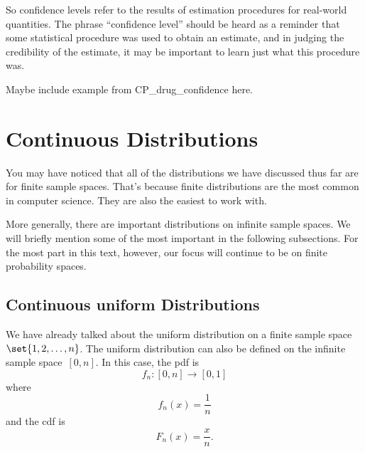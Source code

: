 So confidence levels refer to the results of estimation procedures for
real-world quantities.  The phrase ``confidence level'' should be heard as
a reminder that some statistical procedure was used to obtain an estimate,
and in judging the credibility of the estimate, it may be important to
learn just what this procedure was.

\begin{editingnotes}
Maybe include example from CP\_drug\_confidence here.
\end{editingnotes}

\begin{problems}
\practiceproblems
{}

\classproblems
{}

\examproblems
{}
\end{problems}


\section{Continuous Distributions}

You may have noticed that all of the distributions we have discussed
thus far are for finite sample spaces.  That's because finite
distributions are the most common in computer science.  They are also
the easiest to work with.

More generally, there are important distributions on infinite sample
spaces.  We will briefly mention some of the most important in the
following subsections.  For the most part in this text, however, our
focus will continue to be on finite probability spaces.

\subsection{Continuous uniform Distributions}

We have already talked about the uniform distribution on a finite
sample space~$\set{1, 2, \dots, n}$.  The uniform distribution can
also be defined on the infinite sample space~$[0, n]$.  In this case,
the pdf is
\begin{equation*}
    f_n: [0, n] \to [0, 1]
\end{equation*}
where
\begin{equation*}
    f_n(x) = \frac{1}{n}
\end{equation*}
and the cdf is
\begin{equation*}
    F_n(x) = \frac{x}{n}.
\end{equation*}

